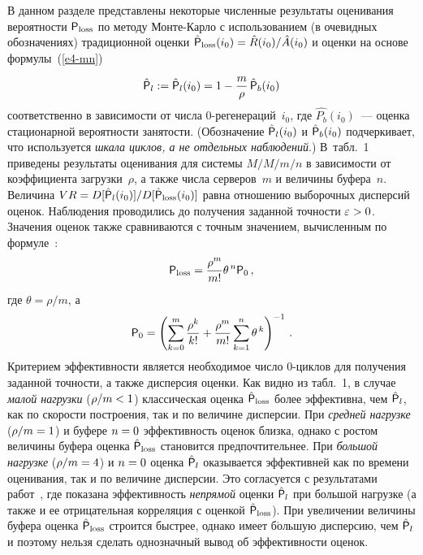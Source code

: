 \begin{multicols}{2}
В данном разделе представлены
некоторые чис\-лен\-ные результаты оценивания вероятности  ${\sf P}_{\mathrm{loss}}$ по методу
Мон\-те-Кар\-ло с использованием (в очевидных обозначениях) традиционной оценки
$\hat{\p}_{\mathrm{loss}}(i_0)\hm=\hat{R}(i_0)/\hat{A}(i_0)$ и оценки на основе формулы~(\ref{e4-mn})
 $$
  \hat{{\sf P}}_l:=\hat{{\sf P}}_l(i_0)=1-\displaystyle\frac{\displaystyle m\mathstrut}{\displaystyle \rho\mathstrut}\,\hat{{\sf P}}_b(i_0)
$$
 соответственно в зависимости от   чис\-ла 0-ре\-ге\-не\-ра\-ций~$i_0$, где
$\hat{P_b}(i_0)$~--- оценка стационарной вероятности занятости. (Обозначение 
$\hat{{\sf P}}_l(i_0)$ и $\hat{{\sf P}}_b(i_0)$ 
 подчеркивает, что используется {\it шкала циклов, а не отдельных
наблюдений}.) В~табл.~1 приведены результаты оценивания  для  сис\-те\-мы
$M/M/m/n$  в зависимости от коэффициента загрузки~$\rho$, а также чис\-ла
серверов~$m$ и величины буфера~$n$. Величина
$VR\hm=D[\hat{\p}_l(i_0)]/D[\hat{\p}_{\mathrm{loss}}(i_0)]$ равна отношению выборочных
дисперсий оценок. Наблюдения проводились до получения заданной точности
$\varepsilon\hm>0$. Значения оценок также сравниваются  с точным значением,
вычисленным по формуле~\cite{Gnedenko}:
\begin{equation*} 
 {\sf P}_{\mathrm{loss}}=\displaystyle\frac{\displaystyle \rho^{m}\mathstrut}{\displaystyle m!\mathstrut}\theta ^{\,n}{\sf P}_0\,,
\end{equation*} 
где $\theta=\rho/m$, а 
\begin{equation*} 
{\sf P}_0=\left(\sum\limits_{k=0}^m\displaystyle\frac{\displaystyle \rho^k\mathstrut}{\displaystyle k!\mathstrut}+\displaystyle\frac{\displaystyle \rho^m\mathstrut}{\displaystyle m!\mathstrut}\sum\limits_{k=1}^n
\theta^{\,k}\right)^{-1}\,. 
\end{equation*} 
Критерием эффективности является необходимое число 0-цик\-лов для получения заданной точности,
а также  дисперсия  оценки.
Как видно из табл.~1,
в случае \textit{малой нагрузки} ($\rho/m\hm<1$) классическая оценка
$\hat{{\sf P}}_{\mathrm{loss}}$ более  эффективна, чем
 $\hat{{\sf P}}_l$,  как по скорости построения, так и по величине  дисперсии.
При \textit{средней нагрузке} ($\rho/m\hm=1$) и  буфере $n\hm=0$
эффективность оценок близка, однако с ростом величины   буфера
оценка $\hat{{\sf P}}_{\mathrm{loss}}$ становится предпочтительнее. При
\textit{большой нагрузке} ($\rho/m\hm=4$) и $n\hm=0$ оценка $\hat{{\sf P}}_l$
оказывается эффективней как по времени оценивания, так и по
величине дисперсии.  Это согласуется с результатами работ~\cite{Whitt90, MorNek}, 
где  показана эффективность {\it непрямой}
оценки $\hat{{\sf P}}_l$ при большой нагрузке (а также и ее отрицательная
корреляция с оценкой $\hat{{\sf P}}_{\mathrm{loss}}$). При увеличении величины
буфера оценка $\hat{{\sf P}}_{\mathrm{loss}}$ строится быстрее, однако имеет
б$\acute{\mbox{о}}$льшую дисперсию, чем $\hat{{\sf P}}_l$ и поэтому нельзя
сделать однозначный вывод об эффективности оценок.




\end{multicols}
